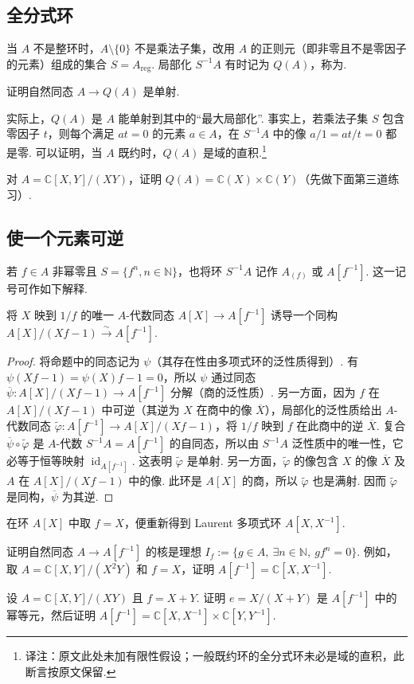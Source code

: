 \subsection{全分式环}\label{sec:galois-1-6-4}
当 $A$ 不是整环时，$A\setminus\{0\}$ 不是乘法子集，改用 $A$ 的正则元（即非零且不是零因子的元素）组成的集合 $S=A_{\mathrm{reg}}$. 局部化 $S^{-1}A$ 有时记为 $Q(A)$，称为.
\begin{exercise*}
证明自然同态 $A\longrightarrow Q(A)$ 是单射.
\end{exercise*}
实际上，$Q(A)$ 是 $A$ 能单射到其中的``最大局部化''. 事实上，若乘法子集 $S$ 包含零因子 $t$，则每个满足 $at=0$ 的元素 $a\in A$，在 $S^{-1}A$ 中的像 $a/1=at/t=0$ 都是零. 可以证明，当 $A$ 既约时，$Q(A)$ 是域的直积.\footnote{译注：原文此处未加有限性假设；一般既约环的全分式环未必是域的直积，此断言按原文保留.}
\begin{exercise*}
对 $A=\mathbb C[X,Y]/(XY)$，证明 $Q(A)=\mathbb C(X)\times\mathbb C(Y)$（先做下面第三道练习）.
\end{exercise*}
\subsection{使一个元素可逆}\label{sec:galois-1-6-5}
若 $f\in A$ 非幂零且 $S=\{f^n,n\in\mathbb N\}$，也将环 $S^{-1}A$ 记作 $A_{(f)}$ 或 $A[f^{-1}]$. 这一记号可作如下解释.
\begin{lemma*}
将 $X$ 映到 $1/f$ 的唯一 $A$-代数同态 $A[X]\longrightarrow A[f^{-1}]$ 诱导一个同构 $A[X]/(Xf-1)\xrightarrow{\sim}A[f^{-1}]$.
\end{lemma*}
\begin{proof}
将命题中的同态记为 $\psi$（其存在性由多项式环的泛性质得到）. 有 $\psi(Xf-1)=\psi(X)f-1=0$，所以 $\psi$ 通过同态 $\overline\psi:A[X]/(Xf-1)\longrightarrow A[f^{-1}]$ 分解（商的泛性质）. 另一方面，因为 $f$ 在 $A[X]/(Xf-1)$ 中可逆（其逆为 $X$ 在商中的像 $\overline X$），局部化的泛性质给出 $A$-代数同态 $\widetilde\varphi:A[f^{-1}]\longrightarrow A[X]/(Xf-1)$，将 $1/f$ 映到 $f$ 在此商中的逆 $\overline X$. 复合 $\overline\psi\circ\widetilde\varphi$ 是 $A$-代数 $S^{-1}A=A[f^{-1}]$ 的自同态，所以由 $S^{-1}A$ 泛性质中的唯一性，它必等于恒等映射 $\operatorname{id}_{A[f^{-1}]}$. 这表明 $\widetilde\varphi$ 是单射. 另一方面，$\widetilde\varphi$ 的像包含 $X$ 的像 $\overline X$ 及 $A$ 在 $A[X]/(Xf-1)$ 中的像. 此环是 $A[X]$ 的商，所以 $\widetilde\varphi$ 也是满射. 因而 $\widetilde\varphi$ 是同构，$\overline\psi$ 为其逆.
\end{proof}
\begin{example*}
在环 $A[X]$ 中取 $f=X$，便重新得到 Laurent 多项式环 $A[X,X^{-1}]$.
\end{example*}
\begin{exercise*}
证明自然同态 $A\longrightarrow A[f^{-1}]$ 的核是理想 $I_f:=\{g\in A,\ \exists n\in\mathbb N,\ gf^n=0\}$. 例如，取 $A=\mathbb C[X,Y]/(X^2Y)$ 和 $f=X$，证明 $A[f^{-1}]=\mathbb C[X,X^{-1}]$.
\end{exercise*}
\begin{exercise*}
设 $A=\mathbb C[X,Y]/(XY)$ 且 $f=X+Y$. 证明 $e=X/(X+Y)$ 是 $A[f^{-1}]$ 中的幂等元，然后证明 $A[f^{-1}]=\mathbb C[X,X^{-1}]\times\mathbb C[Y,Y^{-1}]$.
\end{exercise*}
